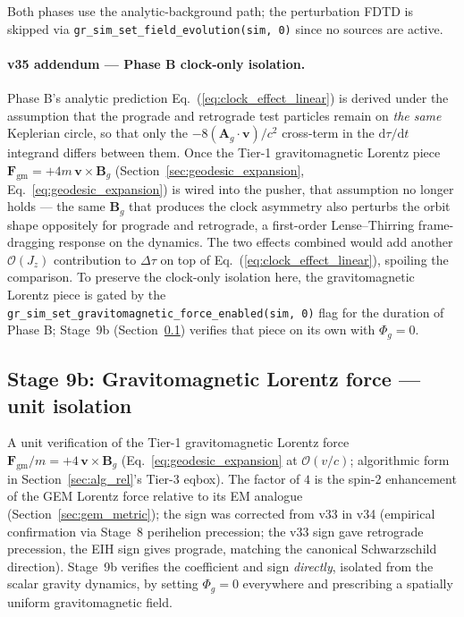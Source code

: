 \documentclass[11pt,a4paper]{article}
\newcommand{\vv}[1]{\mathbf{#1}}
\newcommand{\Phig}{\Phi_g}
\newcommand{\Ag}{\vv{A}_g}
\newcommand{\order}[1]{\mathcal{O}(#1)}
\newcommand{\dd}{\mathrm{d}}
\begin{document}
Both phases use the analytic-background path; the perturbation FDTD is
skipped via \texttt{gr\_sim\_set\_field\_evolution(sim,~0)} since no
sources are active.

\paragraph{v35 addendum --- Phase B clock-only isolation.}  Phase B's
analytic prediction Eq.~(\ref{eq:clock_effect_linear}) is derived under
the assumption that the prograde and retrograde test particles remain on
\emph{the same} Keplerian circle, so that only the
$-8(\Ag\!\cdot\!\vv{v})/c^2$ cross-term in the $\dd\tau/\dd t$ integrand
differs between them.  Once the Tier-1 gravitomagnetic Lorentz piece
$\vv{F}_{\mathrm{gm}} = +4m\,\vv{v}\!\times\!\vv{B}_g$
(Section~\ref{sec:geodesic_expansion}, Eq.~\ref{eq:geodesic_expansion})
is wired into the pusher, that assumption no longer holds --- the same
$\vv{B}_g$ that produces the clock asymmetry also perturbs the orbit
shape oppositely for prograde and retrograde, a first-order Lense--Thirring
frame-dragging response on the dynamics.  The two effects combined would
add another $\order{J_z}$ contribution to $\Delta\tau$ on top of
Eq.~(\ref{eq:clock_effect_linear}), spoiling the comparison.  To preserve
the clock-only isolation here, the gravitomagnetic Lorentz piece is
gated by the \texttt{gr\_sim\_set\_gravitomagnetic\_force\_enabled(sim,
0)} flag for the duration of Phase B; Stage~9b
(Section~\ref{sec:stage_gm_cyclotron}) verifies that piece on its own
with $\Phig = 0$.

\subsection{Stage 9b: Gravitomagnetic Lorentz force --- unit isolation}
\label{sec:stage_gm_cyclotron}

A unit verification of the Tier-1 gravitomagnetic Lorentz force
$\vv{F}_{\mathrm{gm}}/m = +4\,\vv{v}\!\times\!\vv{B}_g$
(Eq.~\ref{eq:geodesic_expansion} at $\order{v/c}$; algorithmic form
in Section~\ref{sec:alg_rel}'s Tier-3 eqbox).  The factor of $4$ is the spin-2
enhancement of the GEM Lorentz force relative to its EM analogue
(Section~\ref{sec:gem_metric}); the sign was corrected from v33 in v34
(empirical confirmation via Stage~8 perihelion precession; the v33 sign
gave retrograde precession, the EIH sign gives prograde, matching the
canonical Schwarzschild direction).  Stage~9b verifies the coefficient
and sign \emph{directly}, isolated from the scalar gravity dynamics, by
setting $\Phig = 0$ everywhere and prescribing a spatially uniform
gravitomagnetic field.
\end{document}
